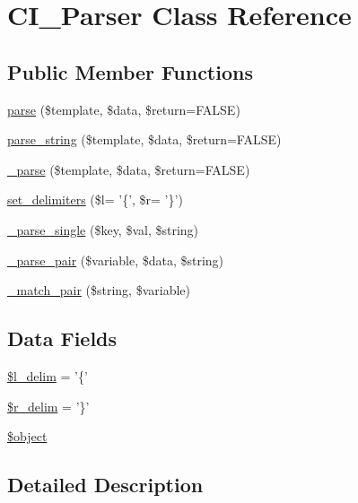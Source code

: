 \hypertarget{class_c_i___parser}{\section{C\-I\-\_\-\-Parser Class Reference}
\label{class_c_i___parser}
}
\subsection*{Public Member Functions}
\begin{DoxyCompactItemize}
\item 
\hyperlink{class_c_i___parser_aed3a838a4afdff95c4bf2b1fb5062cbd}{parse} (\$template, \$data, \$return=F\-A\-L\-S\-E)
\item 
\hyperlink{class_c_i___parser_a5cdfa809d6f2988d2741cb26b5a51d36}{parse\-\_\-string} (\$template, \$data, \$return=F\-A\-L\-S\-E)
\item 
\hyperlink{class_c_i___parser_a6bd5ad826db82a61de1f3a13031faaf9}{\-\_\-parse} (\$template, \$data, \$return=F\-A\-L\-S\-E)
\item 
\hyperlink{class_c_i___parser_a1865a64fc2d5187c9898abd7239a565b}{set\-\_\-delimiters} (\$l= '\{', \$r= '\}')
\item 
\hyperlink{class_c_i___parser_a01c9bb8a5e8802a1b21acf829cc181e7}{\-\_\-parse\-\_\-single} (\$key, \$val, \$string)
\item 
\hyperlink{class_c_i___parser_a3f01fef88e49c40d679e35dedf89a128}{\-\_\-parse\-\_\-pair} (\$variable, \$data, \$string)
\item 
\hyperlink{class_c_i___parser_aa7d5901782e2377f0657d27daeb188c7}{\-\_\-match\-\_\-pair} (\$string, \$variable)
\end{DoxyCompactItemize}
\subsection*{Data Fields}
\begin{DoxyCompactItemize}
\item 
\hyperlink{class_c_i___parser_ab957da01a735e612795fba1c5802b1fb}{\$l\-\_\-delim} = '\{'
\item 
\hyperlink{class_c_i___parser_a4d80dc6a622989846dbd0e39fde0f3bb}{\$r\-\_\-delim} = '\}'
\item 
\hyperlink{class_c_i___parser_a52123b83a1952a68c5513e47d59ec4a6}{\$object}
\end{DoxyCompactItemize}


\subsection{Detailed Description}


